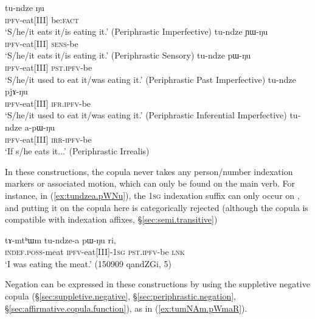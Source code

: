 \begin{exe}
\ex \label{ex:tundze.periphrastic}
\begin{xlist}
\ex \label{ex:tundze.Nu}
\gll tu-ndze ŋu \\
\textsc{ipfv}-eat[III] be:\textsc{fact} \\
\glt `S/he/it eats it/is eating it.' (Periphrastic Imperfective)
\ex \label{ex:tundze.YWNu}
\gll tu-ndze ɲɯ-ŋu \\
\textsc{ipfv}-eat[III] \textsc{sens}-be  \\
\glt `S/he/it eats it/is eating it.' (Periphrastic Sensory)
\ex \label{ex:tundze.pWNu}
\gll tu-ndze pɯ-ŋu \\
\textsc{ipfv}-eat[III] \textsc{pst}.\textsc{ipfv}-be  \\
\glt `S/he/it used to eat it/was eating it.' (Periphrastic Past Imperfective)
\ex \label{ex:tundze.pjANu}
\gll tu-ndze pjɤ-ŋu \\
\textsc{ipfv}-eat[III] \textsc{ifr}.\textsc{ipfv}-be  \\
\glt `S/he/it used to eat it/was eating it.' (Periphrastic Inferential Imperfective)
\ex \label{ex:tundze.apWNu}
\gll tu-ndze a-pɯ-ŋu \\
\textsc{ipfv}-eat[III] \textsc{irr}-\textsc{ipfv}-be  \\
\glt `If s/he eats it...' (Periphrastic Irrealis)
\end{xlist}
\end{exe}

In these constructions, the copula never takes any person/number indexation markers or associated motion, which can only be found on the main verb. For instance, in (\ref{ex:tundzea.pWNu}), the \textsc{1sg} indexation suffix  can only occur on , and putting it on the copula  here is categorically rejected (although the copula  is compatible with indexation affixes, §\ref{sec:semi.transitive})

\begin{exe}
\ex \label{ex:tundzea.pWNu}
\gll  tɤ-mtʰɯm tu-ndze-a pɯ-ŋu ri, \\
\textsc{indef}.\textsc{poss}-meat \textsc{ipfv}-eat[III]-\textsc{1sg} \textsc{pst}.\textsc{ipfv}-be \textsc{lnk} \\
\glt `I was eating the meat.' (150909 qandZGi, 5)
\end{exe}

Negation can be expressed in these constructions by using the suppletive negative copula  (§\ref{sec:suppletive.negative}, §\ref{sec:periphrastic.negation}, §\ref{sec:affirmative.copula.function}), as in (\ref{ex:tumNAm.pWmaR}).

